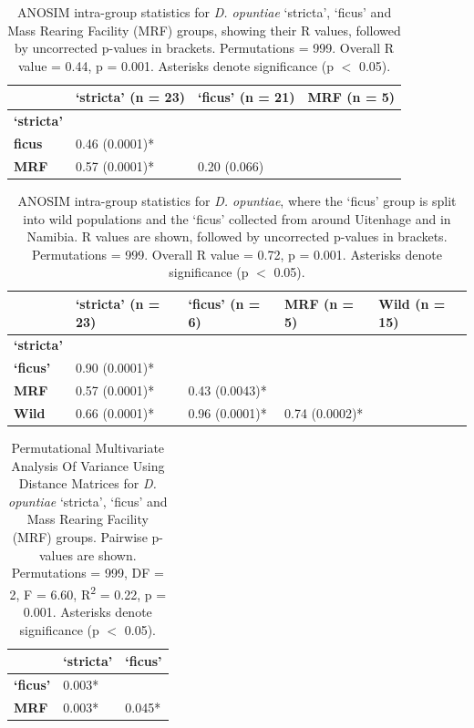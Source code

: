 \begin{table}[H]
\renewcommand{\arraystretch}{0.5}
\centering
\caption{ANOSIM intra-group statistics for \textit{D. opuntiae} `stricta', `ficus' and Mass Rearing Facility (MRF) groups, showing their R values, followed by uncorrected p-values in brackets. Permutations = 999. Overall R value = 0.44, p = 0.001. Asterisks denote significance (p $<$ 0.05).}
\label{tab:ANOSIM_stats}
\begin{tabular}{@{}llll@{}}
\toprule
 & \textbf{`stricta' \scriptsize{(n = 23)}} & \textbf{`ficus' \scriptsize{(n = 21)}} & \textbf{MRF \scriptsize{(n = 5)}} \\ \midrule
\textbf{`stricta'} &  &  &  \\
\textbf{ficus} & 0.46 (0.0001)* &  & \\
\textbf{MRF} & 0.57 (0.0001)* & 0.20 (0.066) & \\ \bottomrule
\end{tabular}
\end{table}

\begin{table}[H]
\renewcommand{\arraystretch}{0.5}
\centering
\caption{ANOSIM intra-group statistics for \textit{D. opuntiae}, where the `ficus' group is split into wild populations and the `ficus' collected from around Uitenhage and in Namibia. R values are shown, followed by uncorrected p-values in brackets. Permutations = 999. Overall R value = 0.72, p = 0.001. Asterisks denote significance (p $<$ 0.05).}
\label{tab:ANOSIM_stats_2}
\begin{tabular}{@{}lllll@{}}
\toprule
 & \textbf{`stricta' \scriptsize{(n = 23)}} & \textbf{`ficus' \scriptsize{(n = 6)}} & \textbf{MRF \scriptsize{(n = 5)}} & \textbf{Wild \scriptsize{(n = 15)}} \\ \midrule
\textbf{`stricta'} &  &  &  &  \\
\textbf{`ficus'} & 0.90 (0.0001)* &  &  & \\
\textbf{MRF} & 0.57 (0.0001)* & 0.43 (0.0043)* &  &  \\
\textbf{Wild} & 0.66 (0.0001)* & 0.96 (0.0001)* & 0.74 (0.0002)* &  \\ \bottomrule
\end{tabular}
\end{table}

\begin{table}[H]
\renewcommand{\arraystretch}{0.5}
\centering
\caption{Permutational Multivariate Analysis Of Variance Using Distance Matrices for \textit{D. opuntiae} `stricta', `ficus' and Mass Rearing Facility (MRF) groups. Pairwise p-values are shown. Permutations = 999, DF = 2, F = 6.60, R\textsuperscript{2} = 0.22, p = 0.001. Asterisks denote significance (p $<$ 0.05).}
\label{tab:adonis_stats}
\begin{tabular}{@{}lll@{}}
\toprule
 & \textbf{`stricta'} & \textbf{`ficus'} \\ \midrule
\textbf{`ficus'} & 0.003* &   \\
\textbf{MRF} & 0.003* & 0.045*   \\ \bottomrule
\end{tabular}
\end{table}

